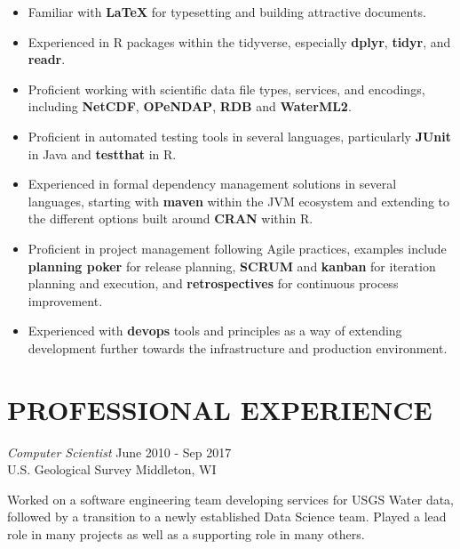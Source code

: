\documentclass[line,margin]{res}
\begin{document}
\begin{resume}
\begin{itemize}
	\item Familiar with \textbf{\LaTeX} for typesetting and building attractive documents.
	\item Experienced in R packages within the tidyverse, especially \textbf{dplyr}, \textbf{tidyr}, and \textbf{readr}.
	\item Proficient working with scientific data file types, services, and encodings, including \textbf{NetCDF}, \textbf{OPeNDAP}, \textbf{RDB} and \textbf{WaterML2}.
	\item Proficient in automated testing tools in several languages, particularly \textbf{JUnit} in Java and \textbf{testthat} in R.
	\item Experienced in formal dependency management solutions in several languages, starting with \textbf{maven} within the JVM ecosystem and extending to the different options built around \textbf{CRAN} within R.
	\item Proficient in project management following Agile practices, examples include \textbf{planning poker} for release planning, \textbf{SCRUM} and \textbf{kanban} for iteration planning and execution, and \textbf{retrospectives} for continuous process improvement.
	\item Experienced with \textbf{devops} tools and principles as a way of extending development further towards the infrastructure and production environment.
\end{itemize}
 
\section{PROFESSIONAL EXPERIENCE}
		{\sl Computer Scientist} \hfill June 2010 - Sep 2017 \\
		U.S. Geological Survey \hfill Middleton, WI

		Worked on a software engineering team developing services for USGS Water data, followed by a transition to a newly established Data Science team.  Played a lead role in many projects as well as a supporting role in many others. 


\end{resume}
\end{document}
